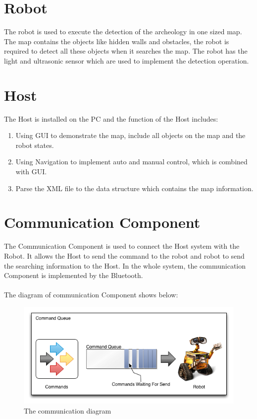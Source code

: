 \documentclass[11pt, a4paper]{report}
\begin{document}
\section{Robot}
The robot is used to execute the detection of the archeology in one sized map. The map contains the objects like hidden walls and obstacles, the robot is required to detect all these objects when it searches the map. The robot has the light and ultrasonic sensor which are used to implement the detection operation.     

\section{Host}
The Host is installed on the PC and the function of the Host includes:
\begin{enumerate}
\item Using GUI to demonstrate the map, include all objects on the map and the robot states.
\item Using Navigation to implement auto and manual control, which is combined with GUI. 
\item Parse the XML file to the data structure which contains the map information.
\end{enumerate}

\section{Communication Component}
The Communication Component is used to connect the Host system with the Robot. It allows the Host to send the command to the robot and robot to send the searching information to the Host. In the whole system, the communication Component is implemented by the Bluetooth. \\ \\
The diagram of communication Component shows below:
\begin{figure}[h]
  \centering
    \includegraphics[width=16cm]{CommandQueue.png}
  \caption{The communication diagram}
\end{figure}
  
\end{document}
